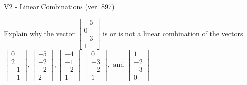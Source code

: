 \begin{exercise}
  \begin{exerciseTitle}V2 - Linear Combinations (ver. 897)\end{exerciseTitle}
  \begin{exerciseStatement}
    Explain why the vector \(\left[\begin{array}{c}
-5 \\
0 \\
-3 \\
1
\end{array}\right]\)  is or is not a linear 
	combination of the vectors \(\left[\begin{array}{c}
0 \\
2 \\
-1 \\
-1
\end{array}\right] , \left[\begin{array}{c}
-5 \\
-2 \\
-2 \\
2
\end{array}\right] , \left[\begin{array}{c}
-4 \\
-1 \\
-2 \\
1
\end{array}\right] , \left[\begin{array}{c}
0 \\
-3 \\
-2 \\
1
\end{array}\right] , \text{ and } \left[\begin{array}{c}
1 \\
-2 \\
-3 \\
0
\end{array}\right]\).
	



\end{exerciseStatement}
\end{exercise}
